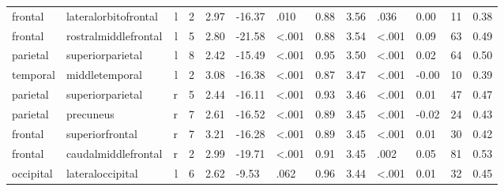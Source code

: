 \documentclass{article}
\begin{document}
\begin{longtable}{llrR{1.3cm}R{1cm}R{1.3cm}R{1cm}R{1cm}R{1.3cm}R{1cm}R{1.8cm}R{1.3cm}R{1.8cm}}
   frontal &      lateralorbitofrontal &    l &         2 &                  2.97 &           -16.37 &               .010 &                               0.88 &                          3.56 &                            .036 &   0.00 &     11 &      0.38 \\
   frontal &      rostralmiddlefrontal &    l &         5 &                  2.80 &           -21.58 &      \textless.001 &                               0.88 &                          3.54 &                   \textless.001 &   0.09 &     63 &      0.49 \\
  parietal &          superiorparietal &    l &         8 &                  2.42 &           -15.49 &      \textless.001 &                               0.95 &                          3.50 &                   \textless.001 &   0.02 &     64 &      0.50 \\
  temporal &            middletemporal &    l &         2 &                  3.08 &           -16.38 &      \textless.001 &                               0.87 &                          3.47 &                   \textless.001 &  -0.00 &     10 &      0.39 \\
  parietal &          superiorparietal &    r &         5 &                  2.44 &           -16.11 &      \textless.001 &                               0.93 &                          3.46 &                   \textless.001 &   0.01 &     47 &      0.47 \\
  parietal &                 precuneus &    r &         7 &                  2.61 &           -16.52 &      \textless.001 &                               0.89 &                          3.45 &                   \textless.001 &  -0.02 &     24 &      0.43 \\
   frontal &           superiorfrontal &    r &         7 &                  3.21 &           -16.28 &      \textless.001 &                               0.89 &                          3.45 &                   \textless.001 &   0.01 &     30 &      0.42 \\
   frontal &       caudalmiddlefrontal &    r &         2 &                  2.99 &           -19.71 &      \textless.001 &                               0.91 &                          3.45 &                            .002 &   0.05 &     81 &      0.53 \\
 occipital &          lateraloccipital &    l &         6 &                  2.62 &            -9.53 &               .062 &                               0.96 &                          3.44 &                   \textless.001 &   0.01 &     32 &      0.45 \\

\end{longtable}
\end{document}
